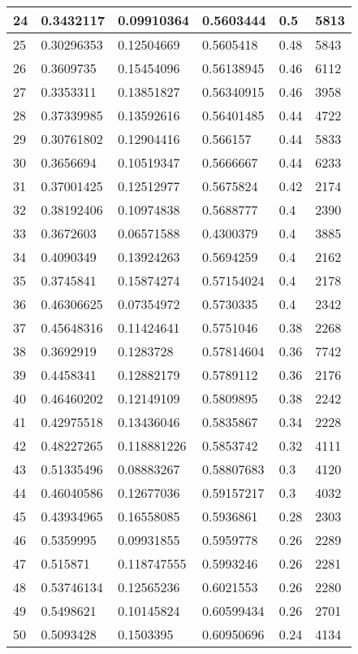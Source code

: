 \begin{longtable}{|l|l|l|l|l|l|}
24 & 0.3432117 & 0.09910364 & 0.5603444 & 0.5 & 5813 \\ \hline 
25 & 0.30296353 & 0.12504669 & 0.5605418 & 0.48 & 5843 \\ \hline 
26 & 0.3609735 & 0.15454096 & 0.56138945 & 0.46 & 6112 \\ \hline 
27 & 0.3353311 & 0.13851827 & 0.56340915 & 0.46 & 3958 \\ \hline 
28 & 0.37339985 & 0.13592616 & 0.56401485 & 0.44 & 4722 \\ \hline 
29 & 0.30761802 & 0.12904416 & 0.566157 & 0.44 & 5833 \\ \hline 
30 & 0.3656694 & 0.10519347 & 0.5666667 & 0.44 & 6233 \\ \hline 
31 & 0.37001425 & 0.12512977 & 0.5675824 & 0.42 & 2174 \\ \hline 
32 & 0.38192406 & 0.10974838 & 0.5688777 & 0.4 & 2390 \\ \hline 
33 & 0.3672603 & 0.06571588 & 0.4300379 & 0.4 & 3885 \\ \hline 
34 & 0.4090349 & 0.13924263 & 0.5694259 & 0.4 & 2162 \\ \hline 
35 & 0.3745841 & 0.15874274 & 0.57154024 & 0.4 & 2178 \\ \hline 
36 & 0.46306625 & 0.07354972 & 0.5730335 & 0.4 & 2342 \\ \hline 
37 & 0.45648316 & 0.11424641 & 0.5751046 & 0.38 & 2268 \\ \hline 
38 & 0.3692919 & 0.1283728 & 0.57814604 & 0.36 & 7742 \\ \hline 
39 & 0.4458341 & 0.12882179 & 0.5789112 & 0.36 & 2176 \\ \hline 
40 & 0.46460202 & 0.12149109 & 0.5809895 & 0.38 & 2242 \\ \hline 
41 & 0.42975518 & 0.13436046 & 0.5835867 & 0.34 & 2228 \\ \hline 
42 & 0.48227265 & 0.118881226 & 0.5853742 & 0.32 & 4111 \\ \hline 
43 & 0.51335496 & 0.08883267 & 0.58807683 & 0.3 & 4120 \\ \hline 
44 & 0.46040586 & 0.12677036 & 0.59157217 & 0.3 & 4032 \\ \hline 
45 & 0.43934965 & 0.16558085 & 0.5936861 & 0.28 & 2303 \\ \hline 
46 & 0.5359995 & 0.09931855 & 0.5959778 & 0.26 & 2289 \\ \hline 
47 & 0.515871 & 0.118747555 & 0.5993246 & 0.26 & 2281 \\ \hline 
48 & 0.53746134 & 0.12565236 & 0.6021553 & 0.26 & 2280 \\ \hline 
49 & 0.5498621 & 0.10145824 & 0.60599434 & 0.26 & 2701 \\ \hline 
50 & 0.5093428 & 0.1503395 & 0.60950696 & 0.24 & 4134 \\ \hline 
\end{longtable}